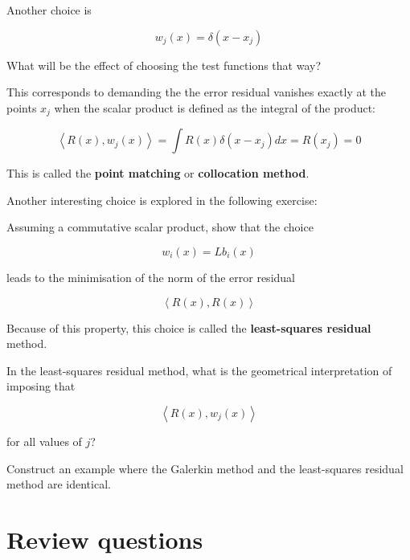 Another choice is

\begin{equation}
w_j(x) = \delta(x-x_j)
\end{equation} 

\begin{cue}
What will be the effect of choosing the test functions that way?  
\end{cue}

This corresponds to demanding the the error residual vanishes exactly at the points $x_j$ when the scalar product is defined as the integral of the product:

\begin{equation}
\left\langle R(x), w_j(x) \right\rangle = \int R(x) \delta(x-x_j) dx = R(x_j) = 0
\end{equation} 

This is called the \textbf{point matching} or \textbf{collocation method}.

Another interesting choice is explored in the following exercise:

\begin{exer}
Assuming a commutative scalar product, show that the choice 

$$w_i(x) = L b_i(x)$$

leads to the minimisation of the norm of the error residual 

$$\left\langle R(x), R(x) \right\rangle$$ 

Because of this property, this choice is called the \textbf{least-squares residual} method.
\end{exer}

\pagebreak

\begin{exer}
In the least-squares residual method, what is the geometrical interpretation of imposing that 

$$\left\langle R(x), w_j(x) \right\rangle$$ 

for all values of $j$?
\end{exer}



\begin{exer}
Construct an example where the Galerkin method and the least-squares residual method are identical.
\end{exer}



\section*{Review questions}

